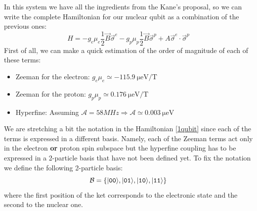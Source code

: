 In this system we have all the ingredients from the Kane's proposal, so we can write the complete Hamiltonian for our nuclear qubit as a combination of the previous ones:
\begin{equation}
  H = -g_e\mu_e\frac{1}{2}\vec{B}\vec{\sigma}^e
      -g_p\mu_p\frac{1}{2}\vec{B}\vec{\sigma}^p
      +A\vec{\sigma}^e\cdot\vec{\sigma}^p
\label{1qubit}
\end{equation}
First of all, we can make a quick estimation of the order of magnitude of each of these terms:
\begin{itemize}
  \item Zeeman for the electron: $g_e\mu_e\simeq\SI{-115.9}{\micro\eV\per\tesla}$
  \item Zeeman for the proton: $g_p\mu_p\simeq\SI{0.176}{\micro\eV\per\tesla}$
  \item Hyperfine: Assuming
  $\mathcal{A}=58MHz\Rightarrow\mathcal{A}\simeq\SI{0.003}{\micro\eV}$
\end{itemize}
We are stretching a bit the notation in the Hamiltonian \eqref{1qubit} since each of the terms is expressed in a different basis. Namely, each of the Zeeman terms act only in the electron \textbf{or} proton spin subspace but the hyperfine coupling has to be expressed in a 2-particle basis that have not been defined yet.
To fix the notation we define the following 2-particle basis:
\begin{equation}
  \mathcal{B}=\left\{|\texttt{0}\texttt{0}\rangle,|\texttt{0}\texttt{1}\rangle,
                     |\texttt{1}\texttt{0}\rangle,|\texttt{1}\texttt{1}\rangle\right\}
\label{basis}
\end{equation}
where the first position of the ket corresponds to the electronic state and the second to the nuclear one.

